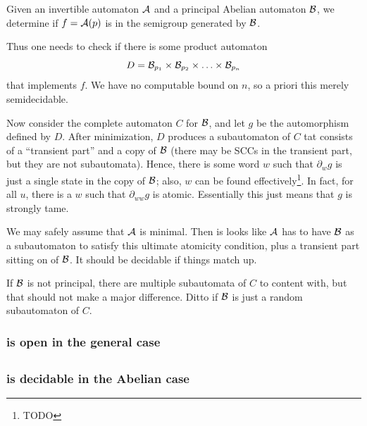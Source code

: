 \documentclass[11pt]{article}
\begin{document}
{\color{TODO}
Given an invertible automaton $\mathcal{A}$ and a principal Abelian automaton
$\mathcal{B}$, we determine if $f = \mathcal{A}(p)$ is in the semigroup generated by $\mathcal{B}$.

Thus one needs to check if there is some product automaton
\[
  D = \mathcal{B}_{p_1} \times \mathcal{B}_{p_2} \times \ldots \times \mathcal{B}_{p_n}
\]
that implements $f$. We have no computable bound on $n$, so a priori
this merely semidecidable.

Now consider the complete automaton $C$ for $\mathcal{B}$, and let $g$ be the
automorphism defined by $D$. After minimization, $D$ produces a
subautomaton of $C$ tat consists of a ``transient part'' and a copy of
$\mathcal{B}$ (there may be SCCs in the transient part, but they are not
subautomata). Hence, there is some word $w$ such that $\partial_w g$
is just a single state in the copy of $\mathcal{B}$; also, $w$ can be found
effectively\footnote{TODO}. In fact, for all $u$, there is a $w$ such
that $\partial_{ww}g$ is atomic. Essentially this just means that $g$
is strongly tame.

We may safely assume that $\mathcal{A}$ is minimal. Then is looks like $\mathcal{A}$ has
to have $\mathcal{B}$ as a subautomaton to satisfy this ultimate atomicity
condition, plus a transient part sitting on of $\mathcal{B}$. It should be
decidable if things match up.

If $\mathcal{B}$ is not principal, there are multiple subautomata of $C$ to
content with, but that should not make a major difference. Ditto if
$\mathcal{B}$ is just a random subautomaton of $C$.

%
}

\subsubsection{ is open in the general case}

\subsection{}
\subsubsection{ is decidable in the Abelian case}
\end{document}
